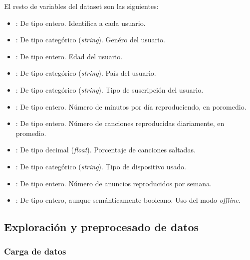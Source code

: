 El resto de variables del dataset son las siguientes:

    \begin{itemize}
        \item {}: De tipo entero. Identifica a cada usuario.
        \item {}: De tipo categórico (\textit{string}). Genéro del usuario.
        \item {}: De tipo entero. Edad del usuario.
        \item {}: De tipo categórico (\textit{string}). País del usuario. 
        \item {}: De tipo categórico (\textit{string}). Tipo de suscripción del usuario.
        \item {}: De tipo entero. Número de minutos por día reproduciendo, en poromedio. 
        \item {}: De tipo entero. Número de canciones reproducidas diariamente, en promedio.
        \item {}: De tipo decimal (\textit{float}). Porcentaje de canciones saltadas. 
        \item {}: De tipo categórico (\textit{string}). Tipo de dispositivo usado. 
        \item {}: De tipo entero. Número de anuncios reproducidos por semana.
        \item {}: De tipo entero, aunque semánticamente booleano. Uso del modo \textit{offline}. 
    \end{itemize}


\subsection{Exploración y preprocesado de datos}

\subsubsection{Carga de datos}

